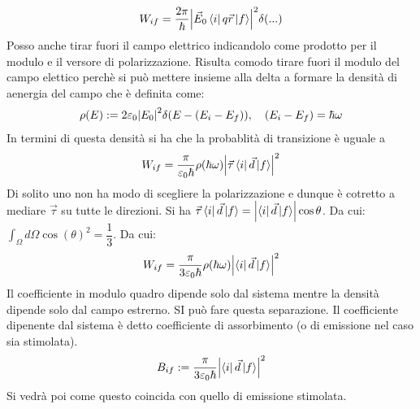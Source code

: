 \documentclass[../AppuntiStruttura.tex]{subfiles}
\begin{document}
		 \begin{gather*}
		 W_{if}=\dfrac{2\pi}{\hbar}\abs{\vec{E}_{0}\bra{i}q\vec{r}\ket{f}}^{2}\delta(...)
		 \end{gather*}
		 Posso anche tirar fuori il campo elettrico indicandolo come prodotto per il modulo e il versore di polarizzazione. Risulta comodo tirare fuori il modulo del campo elettico perchè si può mettere insieme alla delta a formare la densità di aenergia del campo che è definita come:
		 \begin{gather*}
		 \rho(E):=2\varepsilon_{0}\abs{E_{0}}^{2}\delta(E-(E_{i}-E_{f})), \quad (E_{i}-E_{f})=\hbar\omega
		 \end{gather*}
		 In termini di questa densità si ha che la probablità di transizione è uguale a 
		 \begin{gather*}
		 W_{if}=\dfrac{\pi}{\varepsilon_0\hbar}\rho(\hbar\omega)\abs{\vec{\tau}\bra{i}\vec{d}\ket{f}}^{2}
		 \end{gather*}
		 Di solito uno non ha modo di scegliere la polarizzazione e dunque è cotretto a mediare $ \vec{\tau} $ su tutte le direzioni. Si ha $ \vec{\tau}\bra{i}\vec{d}\ket{f}=\abs{\bra{i}\vec{d}\ket{f}}\cos\theta $. Da cui: $ \int_{\Omega}d\Omega \cos(\theta)^{2}=\dfrac{1}{3} $. Da cui:
		 \begin{gather*}
		 		 W_{if}=\dfrac{\pi}{3\varepsilon_0\hbar}\rho(\hbar\omega)\abs{\bra{i}\vec{d}\ket{f}}^{2}
		 \end{gather*}
		 Il coefficiente in modulo quadro dipende solo dal sistema mentre la densità dipende solo dal campo estrerno. SI può fare questa separazione. Il coefficiente dipenente dal sistema è detto coefficiente di assorbimento (o di emissione nel caso sia stimolata).
		 \begin{gather*}
		 B_{if}:=\dfrac{\pi}{3\varepsilon_0\hbar}\abs{\bra{i}\vec{d}\ket{f}}^{2}
		 \end{gather*}
		 Si vedrà poi come questo coincida con quello di emissione stimolata.
\end{document}
